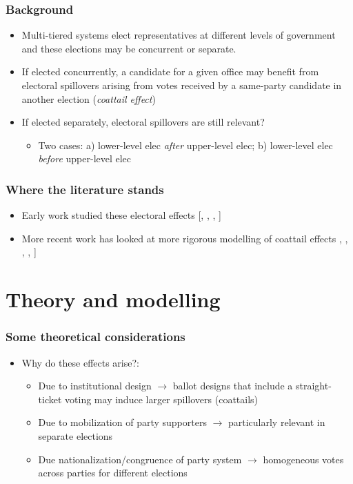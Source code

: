 \documentclass[a4paper,handout,mathserif,final,xcolor=dvipsnames,twocolumn]{beamer}
\begin{document}
\begin{frame}\frametitle{Background}
\begin{itemize}\itemsep 15pt
\item Multi-tiered systems elect representatives at different
levels of government and these elections may be concurrent or
separate.
\item If elected concurrently, a candidate for a given office may
  benefit from electoral spillovers arising from votes received by a
  same-party candidate in another election (\textit{coattail effect})
\item If elected separately, electoral spillovers are still relevant?
\begin{itemize}\itemsep 15pt
\item Two cases: a) lower-level elec \textit{after} upper-level elec;
  b) lower-level elec \textit{before} upper-level elec
\end{itemize}
\end{itemize}
\end{frame}


\begin{frame}\frametitle{Where the literature stands}
\begin{itemize}\itemsep 15pt
\item  Early work studied these electoral effects [\cite{calvert1983},
\cite{ferejohn1984}, \cite{ames1994}, \cite{shugart1995}]
\item More recent work has looked at more rigorous modelling of
  coattail effects  \cite{samuels2000},
\cite{hogan2005}, \cite{oliveros}, \cite{magar2012}, \cite{meredith2013}]
\end{itemize}
\end{frame}

\section{Theory and modelling}
\begin{frame}\frametitle{Some theoretical considerations}
\begin{itemize}\itemsep 15pt
\item Why do these effects arise?:
\begin{itemize} \itemsep 15pt
\item Due to institutional design $\longrightarrow$ ballot designs
  that include a straight-ticket voting may induce larger spillovers
  (coattails)
\item Due to mobilization of party supporters $\longrightarrow$
  particularly relevant in separate elections \cite{meredith2013}
\item Due nationalization/congruence of party system $\longrightarrow$
  homogeneous votes across parties for different elections
\end{itemize}
\end{itemize}
\end{frame}
\end{document}
